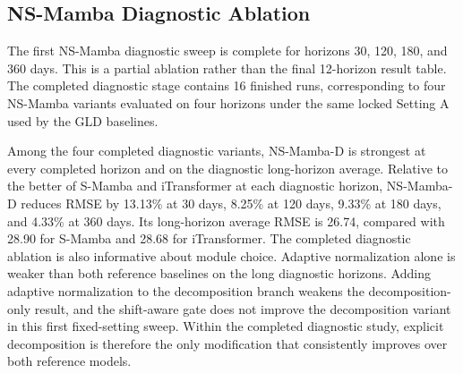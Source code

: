 \subsection{NS-Mamba Diagnostic Ablation}

The first NS-Mamba diagnostic sweep is complete for horizons 30, 120, 180, and 360 days.
This is a partial ablation rather than the final 12-horizon result table.
The completed diagnostic stage contains 16 finished runs, corresponding to four NS-Mamba variants evaluated on four horizons under the same locked Setting A used by the GLD baselines.

\begin{table}[t]
\centering
\caption{Diagnostic GLD RMSE results for NS-Mamba variants. The long average is computed over 120, 180, and 360 days.}
\label{tab:ns-mamba-diagnostic}
\small
{}
\end{table}

Among the four completed diagnostic variants, NS-Mamba-D is strongest at every completed horizon and on the diagnostic long-horizon average.
Relative to the better of S-Mamba and iTransformer at each diagnostic horizon, NS-Mamba-D reduces RMSE by 13.13\% at 30 days, 8.25\% at 120 days, 9.33\% at 180 days, and 4.33\% at 360 days.
Its long-horizon average RMSE is 26.74, compared with 28.90 for S-Mamba and 28.68 for iTransformer.
The completed diagnostic ablation is also informative about module choice.
Adaptive normalization alone is weaker than both reference baselines on the long diagnostic horizons.
Adding adaptive normalization to the decomposition branch weakens the decomposition-only result, and the shift-aware gate does not improve the decomposition variant in this first fixed-setting sweep.
Within the completed diagnostic study, explicit decomposition is therefore the only modification that consistently improves over both reference models.

